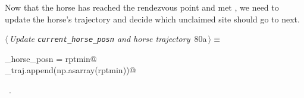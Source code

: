 \documentclass[11.5pt]{report}
\begin{document}
\vspace{-0.8cm} \newchunk Now that the horse has reached the rendezvous point and met , 
we need to update the horse's trajectory and decide which unclaimed site  should go to next. 
\begin{flushleft} \small
\begin{minipage}{\linewidth}\label{scrap124}\raggedright\small
{} $\langle\,${\itshape Update \verb|current_horse_posn| and horse trajectory}\nobreak\ {\footnotesize {80a}}$\,\rangle\equiv$
\vspace{-1ex}
\begin{list}{}{} \item
\mbox{}\verb@current_horse_posn = rptmin@\\
\mbox{}\verb@horse_traj.append(np.asarray(rptmin))@\\
\mbox{}\verb@@{\NWsep}
\end{list}
\vspace{-1.5ex}
\footnotesize
\begin{list}{}{\setlength{\itemsep}{-\parsep}\setlength{\itemindent}{-\leftmargin}}
\item \NWtxtMacroRefIn\ .

\item{}
\end{list}
\end{minipage}\vspace{4ex}
\end{flushleft}
\end{document}
